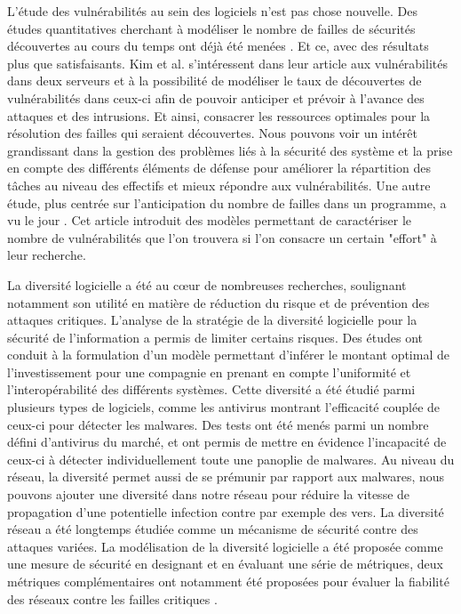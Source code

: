L'étude des vulnérabilités au sein des logiciels n'est pas chose nouvelle. Des études quantitatives cherchant à modéliser le
nombre de failles de sécurités découvertes au cours du temps ont déjà été menées \cite{vulnerabilityDiscovery}. Et ce, avec des
résultats plus que satisfaisants. Kim et al. s'intéressent dans leur article aux vulnérabilités dans deux serveurs et à la possibilité de modéliser le taux de découvertes de vulnérabilités dans ceux-ci
afin de pouvoir anticiper et prévoir à l'avance des attaques et des intrusions. Et ainsi, consacrer les ressources optimales pour la résolution des failles qui
seraient découvertes. Nous pouvons voir un intérêt grandissant dans la gestion des problèmes liés à la sécurité des système et la prise en compte des différents éléments de défense pour améliorer la répartition des tâches au niveau des effectifs et mieux répondre aux vulnérabilités. Une autre étude, plus centrée sur l'anticipation du
nombre de failles dans un programme, a vu le jour \cite{assessingVulnerabilities}. Cet article introduit des modèles
permettant de caractériser le nombre de vulnérabilités que l'on trouvera si l'on consacre un certain "effort" à leur recherche.

La diversité logicielle a été au cœur de nombreuses recherches, soulignant notamment son utilité en matière de réduction du risque \cite{softwareDiversityStateOfTheArt} et de prévention des attaques critiques. L'analyse de la stratégie de la diversité logicielle pour la sécurité de l’information a permis de limiter certains risques. Des études ont conduit à la formulation d'un modèle permettant d'inférer le montant optimal de l’investissement pour une compagnie en prenant en compte l’uniformité et l’interopérabilité des différents systèmes\cite{informationSecurity}. 
Cette diversité a été étudié parmi plusieurs types de logiciels, comme les antivirus \cite{DiversityForSecurityAntivirus}montrant l’efficacité couplée de ceux-ci pour détecter les malwares. Des tests ont été menés parmi un nombre défini d'antivirus du marché, et ont permis de mettre en évidence l'incapacité de ceux-ci à détecter individuellement toute une panoplie de malwares.
 Au niveau du réseau, la diversité permet aussi de se prémunir par rapport aux malwares, nous pouvons ajouter une diversité dans notre réseau pour réduire la vitesse de propagation d’une potentielle infection \cite{OptimisingNetwork} contre par exemple des vers. La diversité réseau a été longtemps étudiée comme un mécanisme de sécurité contre des attaques variées. La modélisation de la diversité logicielle a été proposée comme une mesure de sécurité en designant et en évaluant une série de métriques, deux métriques complémentaires ont notamment été proposées pour évaluer la fiabilité des réseaux contre les failles critiques \cite{networkDiversity}.


